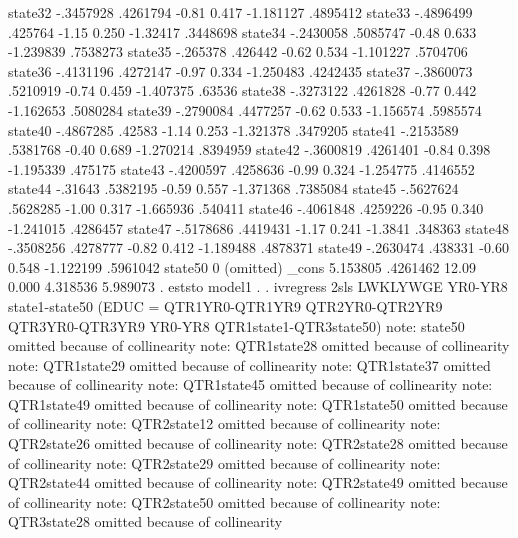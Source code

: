      state32 {\VBAR}  -.3457928   .4261794    -0.81   0.417    -1.181127    .4895412
     state33 {\VBAR}  -.4896499    .425764    -1.15   0.250     -1.32417    .3448698
     state34 {\VBAR}  -.2430058   .5085747    -0.48   0.633    -1.239839    .7538273
     state35 {\VBAR}   -.265378    .426442    -0.62   0.534    -1.101227    .5704706
     state36 {\VBAR}  -.4131196   .4272147    -0.97   0.334    -1.250483    .4242435
     state37 {\VBAR}  -.3860073   .5210919    -0.74   0.459    -1.407375      .63536
     state38 {\VBAR}  -.3273122   .4261828    -0.77   0.442    -1.162653    .5080284
     state39 {\VBAR}  -.2790084   .4477257    -0.62   0.533    -1.156574    .5985574
     state40 {\VBAR}  -.4867285     .42583    -1.14   0.253    -1.321378    .3479205
     state41 {\VBAR}  -.2153589   .5381768    -0.40   0.689    -1.270214    .8394959
     state42 {\VBAR}  -.3600819   .4261401    -0.84   0.398    -1.195339     .475175
     state43 {\VBAR}  -.4200597   .4258636    -0.99   0.324    -1.254775    .4146552
     state44 {\VBAR}    -.31643   .5382195    -0.59   0.557    -1.371368    .7385084
     state45 {\VBAR}  -.5627624   .5628285    -1.00   0.317    -1.665936     .540411
     state46 {\VBAR}  -.4061848   .4259226    -0.95   0.340    -1.241015    .4286457
     state47 {\VBAR}  -.5178686   .4419431    -1.17   0.241      -1.3841     .348363
     state48 {\VBAR}  -.3508256   .4278777    -0.82   0.412    -1.189488    .4878371
     state49 {\VBAR}  -.2630474    .438331    -0.60   0.548    -1.122199    .5961042
     state50 {\VBAR}          0  (omitted)
       _cons {\VBAR}   5.153805   .4261462    12.09   0.000     4.318536    5.989073
{\smallskip}
. eststo model1
{\smallskip}
. 
. ivregress 2sls LWKLYWGE YR0-YR8 state1-state50 (EDUC = QTR1YR0-QTR1YR9 QTR2YR0-QTR2YR9 QTR3YR0-QTR3YR9 YR0-YR8 QTR1state1-QTR3state50)
note: state50 omitted because of collinearity
note: QTR1state28 omitted because of collinearity
note: QTR1state29 omitted because of collinearity
note: QTR1state37 omitted because of collinearity
note: QTR1state45 omitted because of collinearity
note: QTR1state49 omitted because of collinearity
note: QTR1state50 omitted because of collinearity
note: QTR2state12 omitted because of collinearity
note: QTR2state26 omitted because of collinearity
note: QTR2state28 omitted because of collinearity
note: QTR2state29 omitted because of collinearity
note: QTR2state44 omitted because of collinearity
note: QTR2state49 omitted because of collinearity
note: QTR2state50 omitted because of collinearity
note: QTR3state28 omitted because of collinearity
